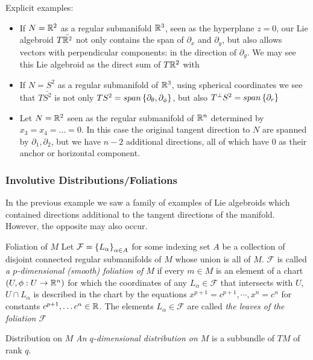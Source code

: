 Explicit examples:
\begin{itemize}
\item If $N = \mathbb{R}^2$ as a regular submanifold $\mathbb{R}^3$, seen as the hyperplane $z = 0$, our Lie algebroid $T \bar {\mathbb{R}^2}$ not only contains the span of $\partial_x$ and $\partial_y$, but also allows vectors with perpendicular components: in the direction of $\partial_y$. We may see this Lie algebroid as the direct sum of $T \mathbb{R}^2$ with 
\item If $N = S^2$ as a regular submanifold of $\mathbb{R}^3$, using spherical coordinates we see that $T \bar {S^2}$ is not only $TS^2 = span\set{\partial_\theta, \partial_\phi}$, but also $T^\perp S^2 = span\left\{ \partial_r \right\}$ 
\item Let $N = \mathbb{R}^2$ seen as the regular submanifold of $\mathbb{R}^n$ determined by $x_3 = x_4 = \dots = 0$. In this case the original tangent direction to $N$ are spanned by $\partial_1, \partial_2$, but we have $n-2$ additional directions, all of which have $0$ as their anchor or horizontal component.
\end{itemize}

\subsubsection{Involutive Distributions/Foliations}

In the previous example we saw a family of examples of Lie algebroids which contained directions additional to the tangent directions of the manifold. However, the opposite may also occur.

\begin{definition} {Foliation of $M$}
Let $\mathcal F = \left\{ L_\alpha \right\}_{\alpha \in A}$ for some indexing set $A$ be a collection of disjoint connected regular submanifolds of $M$ whose union is all of $M$. $\mathcal F$ is called \emph{a $p$-dimensional (smooth) foliation of $M$} if every $m \in M$ is an element of a chart  $(U, \phi:U \to \RR^n)$ for which the coordinates of any $L_\alpha \in \mathcal F$ that intersects with $U$, $U \cap L_\alpha$ is described in the chart by the equations $x^{p+1} = c^{p+1}, \cdots , x^{n} = c^{n} $ for constants $c^{p+1}, \dots c^n \in \mathbb{R}$. The elements $L_\alpha \in \mathcal F$ are called \emph{the leaves of the foliation $\mathcal F$}
\end{definition}

\begin{definition}{Distribution on $M$}
\emph{An $q$-dimensional distribution on $M$} is a subbundle of $TM$ of rank $q$.
\end{definition}

